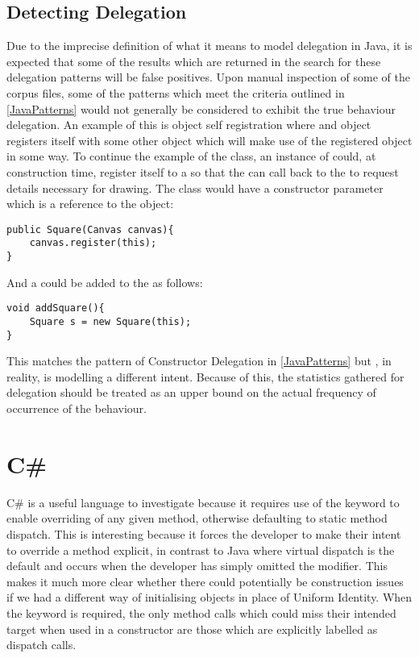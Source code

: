 \subsection{Detecting Delegation}
Due to the imprecise definition of what it means to model delegation in Java, it is expected that some of the results which are returned in the search for these delegation patterns will be false positives. Upon manual inspection of some of the corpus files, some of the patterns which meet the criteria outlined in \ref{JavaPatterns} would not generally be considered to exhibit the true behaviour delegation. An example of this is object self registration where and object registers itself with some other object which will make use of the registered object in some way. To continue the example of the  class, an instance of  could, at construction time,  register itself to a  so that the  can call back to the  to request details necessary for drawing. The  class would have a constructor parameter which is a reference to the  object:
\begin{lstlisting}
public Square(Canvas canvas){
	canvas.register(this);
}
\end{lstlisting}
And a  could be added to the  as follows:
\begin{lstlisting}
void addSquare(){
	Square s = new Square(this);
}
\end{lstlisting}
This matches the pattern of Constructor Delegation in \ref{JavaPatterns} but , in reality, is modelling a different intent. Because of this, the statistics gathered for delegation should be treated as an upper bound on the actual frequency of occurrence of the behaviour.
\newline

\section{C\#}
C\# is a useful language to investigate because it requires use of the  keyword to enable overriding of any given method, otherwise defaulting to static method dispatch. This is interesting because it forces the developer to make their intent to override a method explicit, in contrast to Java where virtual dispatch is the default and occurs when the developer has simply omitted the  modifier. This makes it much more clear whether there could potentially be construction issues if we had a different way of initialising objects in place of Uniform Identity. When the  keyword is required, the only method calls which could miss their intended target when used in a constructor are those which are explicitly labelled as  dispatch calls.

